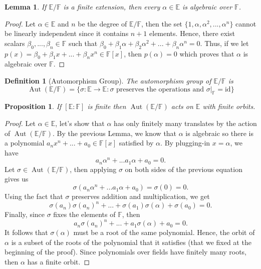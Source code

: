 \documentclass{article}
\newtheorem*{proposition}{Proposition}
\newtheorem*{lemma}{Lemma}
\newtheorem*{definition}{Definition}
\newcommand{\F}{\mathbb{F}}
\newcommand{\E}{\mathbb{E}}
\DeclareMathOperator{\Aut}{\text{Aut}}
\begin{document}
\begin{lemma}
    If $\E / \F$ is a finite extension, then every $\alpha \in \E$ is algebraic over $\F$.
\end{lemma}

\begin{proof}
    Let $\alpha \in \E$ and $n$ be the degree of $\E / \F$, then the set $\{1, \alpha, \alpha^2, ..., \alpha^n\}$ cannot be linearly independent since it contains $n+1$ elements. Hence, there exist scalars $\beta_0, ..., \beta_n \in \F$ such that $\beta_0 + \beta_1 \alpha + \beta_2 \alpha^2 +  ... + \beta_n \alpha^n = 0$. Thus, if we let $p(x) = \beta_0 + \beta_1 x +  ... + \beta_n x^n \in \F[x]$, then $p(\alpha) = 0$ which proves that $\alpha$ is algebraic over $\F$. 
\end{proof}

\begin{definition}[Automorphism Group]
    The automorphism group of $\E / \F$ is
    $$\Aut(\E / \F) = \{\sigma: \E \to \E : \sigma \text{ preserves the operations and } \sigma|_{\F} = \text{id} \}$$
\end{definition}

\begin{proposition}
    If $[\E : \F]$ is finite then $\Aut(\E / \F)$ acts on $\E$ with finite orbits.
\end{proposition}

\begin{proof}
    Let $\alpha \in \E$, let's show that $\alpha$ has only finitely many translates by the action of $\Aut(\E / \F)$. By the previous Lemma, we know that $\alpha$ is algebraic so there is a polynomial $a_n x^n + ... + a_0 \in \F[x]$ satisfied by $\alpha$.  By plugging-in $x = \alpha$, we have
    $$a_n \alpha^n + ... a_1 \alpha + a_0 = 0.$$
    Let $\sigma \in \Aut(\E / \F)$, then applying $\sigma$ on both sides of the previous equation gives us 
    $$\sigma(a_n \alpha^n + ... a_1 \alpha + a_0) = \sigma(0) = 0.$$
    Using the fact that $\sigma$ preserves addition and multiplication, we get
    $$\sigma(a_n)\sigma(a_n)^n + ... + \sigma(a_1)\sigma(\alpha) + \sigma(a_0) = 0.$$
    Finally, since $\sigma$ fixes the elements of $\F$, then 
    $$a_n\sigma(a_n)^n + ... + a_1\sigma(\alpha) + a_0 = 0.$$
    It follows that $\sigma(\alpha)$ must be a root of the same polynomial. Hence, the orbit of $\alpha$ is a subset of the roots of the polynomial that it satisfies (that we fixed at the beginning of the proof). Since polynomials over fields have finitely many roots, then $\alpha$ has a finite orbit.
\end{proof}
\end{document}
